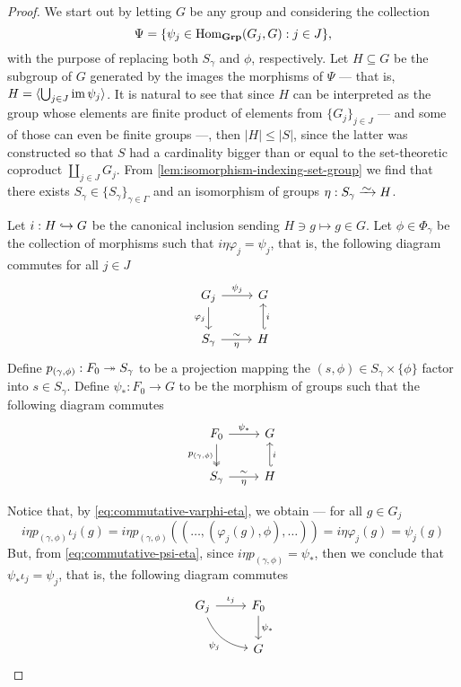 \begin{proof}
We start out by letting \(G\) be any group and considering the collection
\[
  \Psi = \{\psi_{j} \in \operatorname{Hom}_{{\textbf{Grp}}}(G_j, G) : j \in J\},
\]
with the purpose of replacing both \(S_{\gamma}\) and \(\phi\),
respectively. Let \(H \subseteq G\) be the subgroup of \(G\) generated by the
images the morphisms of \(\Psi\) --- that is, \(H = \langle \bigcup_{j \in J}
\operatorname{im} \psi_j \rangle\). It is natural to see that since \(H\) can be interpreted
as the group whose elements are finite product of elements from \(\{G_{j}\}_{j
\in J}\) --- and some of those can even be finite groups ---, then \(|H| \leq
|S|\), since the latter was constructed so that \(S\) had a cardinality bigger
than or equal to the set-theoretic coproduct \(\coprod_{j \in J} G_j\). From
\cref{lem:isomorphism-indexing-set-group} we find that there exists \(S_{\gamma}
\in \{S_{\gamma}\}_{\gamma \in \Gamma}\) and an isomorphism of groups \(\eta:
S_{\gamma} \isoto H\).

Let \(i: H \hookrightarrow G\) be the canonical inclusion sending \(H \ni g \mapsto g \in
G\). Let \(\phi \in \Phi_{\gamma}\) be the collection of morphisms such that \(i
\eta \varphi_j = \psi_j\), that is, the following diagram commutes for all \(j
\in J\)
\begin{equation*}
\label{eq:commutative-varphi-eta}
  \begin{tikzcd}
    G_j \ar[r, "\psi_j"] \ar[d, swap, "\varphi_j"] &G \\
    S_{\gamma} \ar[r, "\eta"', "\sim"] &H \ar[u, hook', swap, "i"]
  \end{tikzcd}
\end{equation*}
Define \(p_{(\gamma, \phi)}: F_0 \twoheadrightarrow S_{\gamma}\) to be a projection mapping
the \((s, \phi) \in S_{\gamma} \times \{\phi\}\) factor into \(s \in
S_{\gamma}\). Define \(\psi_{*}: F_0 \to G\) to be the morphism of groups such
that the following diagram commutes
\begin{equation*}
\label{eq:commutative-psi-eta}
  \begin{tikzcd}
    F_0 \ar[d, two heads, swap, "p_{(\gamma, \phi)}"] \ar[r, "\psi_{*}"] &G \\
    S_{\gamma} \ar[r, "\sim", "\eta"'] &H \ar[u, hook', "i"']
  \end{tikzcd}
\end{equation*}

Notice that, by \cref{eq:commutative-varphi-eta}, we obtain --- for all \(g \in
G_j\)
\[
  i \eta p_{(\gamma, \phi)} \iota_j(g)
  = i \eta p_{(\gamma, \phi)}((\dots, (\varphi_j(g), \phi), \dots))
  = i \eta \varphi_j(g)
  = \psi_j(g)
\]
But, from \cref{eq:commutative-psi-eta}, since \(i \eta p_{(\gamma, \phi)} =
\psi_{*}\), then we conclude that \(\psi_{*} \iota_j = \psi_j\), that is, the
following diagram commutes
\[
  \begin{tikzcd}
    G_j \ar[r, "\iota_j"] \ar[dr, bend right, swap, "\psi_j"]
      &F_0 \ar[d, "\psi_{*}"] \\
    &G
  \end{tikzcd}
\]


\end{proof}
